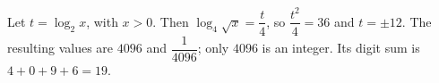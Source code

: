 Let $t=\log_2x$, with $x>0$. Then $\log_4\sqrt x=\dfrac{t}{4}$, so $\dfrac{t^2}{4}=36$ and $t=\pm12$. The resulting values are $4096$ and $\dfrac{1}{4096}$; only $4096$ is an integer. Its digit sum is $4+0+9+6=\boxed{19}$.
